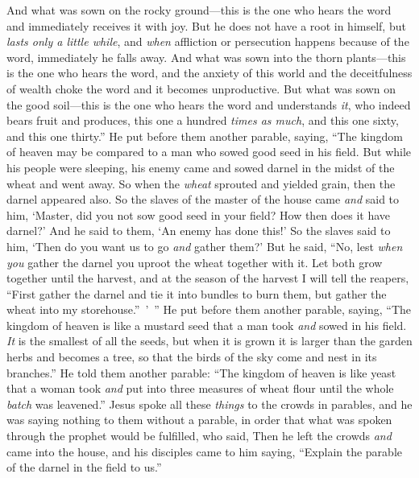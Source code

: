 \begin{biblechapter}
\verse And what was sown on the rocky ground—this is the one who hears the word and immediately receives it with joy.
\verse But he does not have a root in himself, but \textit{lasts only a little while}, and \textit{when} affliction or persecution happens because of the word, immediately he falls away.
\verse And what was sown into the thorn plants—this is the one who hears the word, and the anxiety of this world and the deceitfulness of wealth choke the word and it becomes unproductive.
\verse But what was sown on the good soil—this is the one who hears the word and understands \textit{it}, who indeed bears fruit and produces, this one a hundred \textit{times as much}, and this one sixty, and this one thirty.”
 He put before them another parable, saying, “The kingdom of heaven may be compared to a man who sowed good seed in his field.
\verse But while his people were sleeping, his enemy came and sowed darnel in the midst of the wheat and went away.
\verse So when the \textit{wheat} sprouted and yielded grain, then the darnel appeared also.
\verse So the slaves of the master of the house came \textit{and} said to him, ‘Master, did you not sow good seed in your field? How then does it have darnel?’
\verse And he said to them, ‘An enemy has done this!’ So the slaves said to him, ‘Then do you want us to go \textit{and} gather them?’
\verse But he said, “No, lest \textit{when you} gather the darnel you uproot the wheat together with it.
\verse Let both grow together until the harvest, and at the season of the harvest I will tell the reapers, “First gather the darnel and tie it into bundles to burn them, but gather the wheat into my storehouse.” ’ ”
 He put before them another parable, saying, “The kingdom of heaven is like a mustard seed that a man took \textit{and} sowed in his field.
\verse \textit{It} is the smallest of all the seeds, but when it is grown it is larger than the garden herbs and becomes a tree, so that the birds of the sky come and nest in its branches.”
 He told them another parable: “The kingdom of heaven is like yeast that a woman took \textit{and} put into three measures of wheat flour until the whole \textit{batch} was leavened.”
 Jesus spoke all these \textit{things} to the crowds in parables, and he was saying nothing to them without a parable,
\verse in order that what was spoken through the prophet would be fulfilled, who said,
 Then he left the crowds \textit{and} came into the house, and his disciples came to him saying, “Explain the parable of the darnel in the field to us.”

\end{biblechapter}
